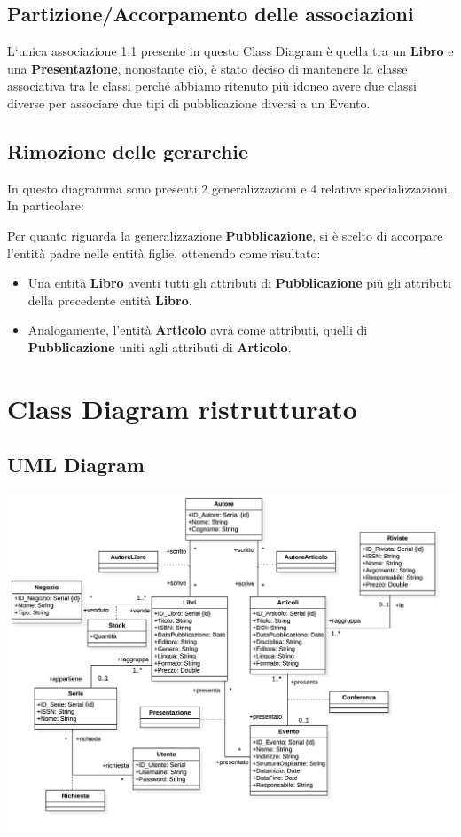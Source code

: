         \subsection{Partizione/Accorpamento delle associazioni}
        L`unica associazione 1:1 presente in questo Class Diagram \`e quella tra un \textbf{Libro} e una \textbf{Presentazione},
        nonostante ci\`o, \`e stato deciso di mantenere la classe associativa tra le classi perch\'e abbiamo ritenuto pi\`u idoneo
        avere due classi diverse per associare due tipi di pubblicazione diversi a un Evento.

            
        \subsection{Rimozione delle gerarchie}
            In questo diagramma sono presenti 2 generalizzazioni e 4 relative specializzazioni.
            In particolare:

            Per quanto riguarda la generalizzazione \textbf{Pubblicazione}, si \`e scelto di accorpare l'entit\`a padre
            nelle entit\`a figlie, ottenendo come risultato:
            \begin{itemize}
                  \item Una entit\`a \textbf{Libro} aventi tutti gli attributi di \textbf{Pubblicazione} pi\`u
                        gli attributi della precedente entit\`a \textbf{Libro}.
                  \item Analogamente, l'entit\`a \textbf{Articolo} avr\`a come attributi, quelli di \textbf{Pubblicazione}
                        uniti agli attributi di \textbf{Articolo}.
            \end{itemize}
    
    \section{Class Diagram ristrutturato}
    \subsection{UML Diagram}
    \includegraphics[scale=0.18]{Immagini/SchemaRistrutturato.png}
